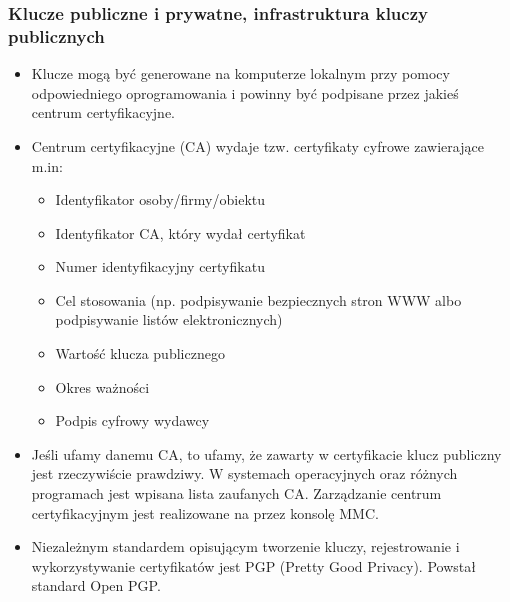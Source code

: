 \documentclass[../main.tex]{subfiles}
\begin{document}
    \subsubsection{Klucze publiczne i prywatne, infrastruktura kluczy publicznych}
    \begin{itemize}
        \item Klucze mogą być generowane na komputerze
        lokalnym przy pomocy odpowiedniego oprogramowania i powinny być podpisane przez
        jakieś centrum certyfikacyjne.
        \item Centrum certyfikacyjne (CA) wydaje tzw. certyfikaty cyfrowe zawierające m.in:
        \begin{itemize}
            \item Identyfikator osoby/firmy/obiektu
            \item Identyfikator CA, który wydał certyfikat
            \item Numer identyfikacyjny certyfikatu
            \item Cel stosowania (np. podpisywanie bezpiecznych stron WWW albo podpisywanie listów elektronicznych)
            \item Wartość klucza publicznego
            \item Okres ważności
            \item Podpis cyfrowy wydawcy
        \end{itemize}
        \item Jeśli ufamy danemu CA, to ufamy, że zawarty w certyfikacie klucz publiczny jest rzeczywiście prawdziwy.
        W systemach operacyjnych oraz różnych programach jest wpisana lista zaufanych CA.
        Zarządzanie centrum certyfikacyjnym jest realizowane na przez konsolę MMC.
        \item Niezależnym standardem opisującym tworzenie kluczy, rejestrowanie i wykorzystywanie
        certyfikatów jest PGP (Pretty Good Privacy). Powstał standard Open PGP.

    \end{itemize}
\end{document}
